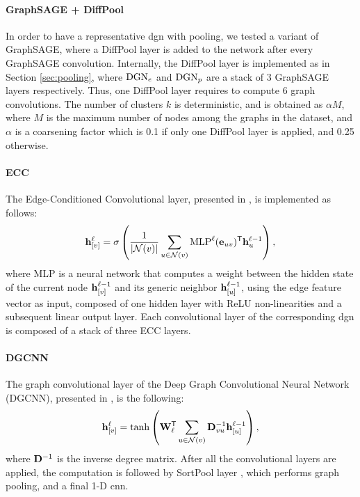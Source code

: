 \paragraph{GraphSAGE + DiffPool}
In order to have a representative \gls{dgn} with pooling, we tested a variant of GraphSAGE, where a DiffPool layer is added to the network after every GraphSAGE convolution. Internally, the DiffPool layer is implemented as in Section \ref{sec:pooling}, where $\mathrm{DGN}_e$ and $\mathrm{DGN}_p$ are a stack of 3 GraphSAGE layers respectively. Thus, one DiffPool layer requires to compute 6 graph convolutions. The number of clusters $k$ is deterministic, and is obtained as $\alpha M$, where $M$ is the maximum number of nodes among the graphs in the dataset, and $\alpha$ is a coarsening factor which is 0.1 if only one DiffPool layer is applied, and 0.25 otherwise.

\paragraph{ECC}
The Edge-Conditioned Convolutional layer, presented in \cite{?}, is implemented as follows:
$$\Elem{h}{v}^{\ell} = \sigma\Paren{ \frac{1}{|\Cal{N}(v)|}\sum_{u \in \Cal{N}(v)} \Fun{MLP}^{\ell}(\Vector{e}_{uv})^{\Transpose} \mathbf{h}_u^{\ell-1}},$$
where MLP is a neural network that computes a weight between the hidden state of the current node $\Elem{h}{v}^{\ell-1}$ and its generic neighbor $\Elem{h}{u}^{\ell-1}$, using the edge feature vector as input, composed of one hidden layer with ReLU non-linearities and a subsequent linear output layer. Each convolutional layer of the corresponding \gls{dgn} is composed of a stack of three ECC layers.

\paragraph{DGCNN}
The graph convolutional layer of the Deep Graph Convolutional Neural Network (DGCNN), presented in \cite{?}, is the following:
$$\Elem{h}{v}^{\ell} = \Fun{tanh} \Paren{\Matrix{W}_{\ell}^{\Transpose} \sum_{u \in \mathcal{N}(v)} \Matrix{D}^{-1}_{vu}\Elem{h}{u}^{\ell-1}},$$
where $\Matrix{D}^{-1}$ is the inverse degree matrix. After all the convolutional layers are applied, the computation is followed by SortPool layer \cite{?}, which performs graph pooling, and a final 1-D \gls{cnn}.


